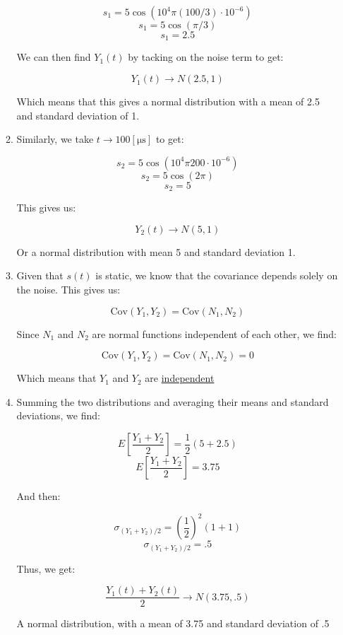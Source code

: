 \begin{enumerate}
\begin{enumerate}
        $$s_1=5\cos(10^4\pi (100/3)\cdot10^{-6})$$
        $$s_1=5\cos(\pi/3)$$
        $$s_1=2.5$$

        We can then find $Y_1(t)$ by tacking on the noise term to get:

        $$\boxed{Y_1(t)\to N(2.5,1)}$$

        Which means that this gives a normal distribution with a mean of 2.5 and standard deviation of 1.

      \item Similarly, we take $t\to100[\si{\micro\second}]$ to get:

        $$s_2=5\cos(10^4\pi 200\cdot10^{-6})$$
        $$s_2=5\cos(2\pi)$$
        $$s_2=5$$

        This gives us:

        $$\boxed{Y_2(t)\to N(5,1)}$$

        Or a normal distribution with mean 5 and standard deviation 1.

      \item Given that $s(t)$ is static, we know that the covariance depends solely on the noise. This gives us:

        $$\text{Cov}(Y_1,Y_2)=\text{Cov}(N_1,N_2)$$

        Since $N_1$ and $N_2$ are normal functions independent of each other, we find:

        $$\text{Cov}(Y_1,Y_2)=\text{Cov}(N_1,N_2)=0$$

        Which means that $Y_1$ and $Y_2$ are \underline{independent}

      \item Summing the two distributions and averaging their means and standard deviations, we find:

        $$E\left[ \frac{Y_1+Y_2}{2} \right]=\frac{1}{2}(5+2.5)$$
        $$E\left[ \frac{Y_1+Y_2}{2} \right]=3.75$$

        And then:

        $$\sigma_{(Y_1+Y_2)/2}=\left( \frac{1}{2} \right)^2(1+1)$$
        $$\sigma_{(Y_1+Y_2)/2}=.5$$

        Thus, we get:

        $$\boxed{\frac{Y_1(t)+Y_2(t)}{2}\to N(3.75,.5)}$$

        A normal distribution, with a mean of 3.75 and standard deviation of .5

    \end{enumerate}

    \setcounter{enumi}{3}


\end{enumerate}
